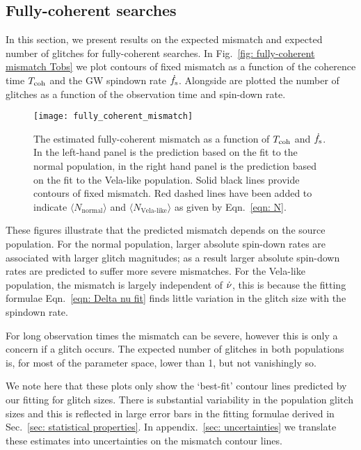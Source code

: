\documentclass[../full_thesis/full_thesis.tex]{subfiles}
\begin{document}
\subsection{Fully-coherent searches}

In this section, we present results on the expected mismatch and expected number
of glitches for fully-coherent searches. In Fig.~\ref{fig: fully-coherent mismatch
Tobs} we plot contours of fixed mismatch as a function of the coherence time
$T_{\mathrm{coh}}$ and the GW spindown rate $\dot{f}_{\textrm{s}}$. Alongside are plotted the number of
glitches as a function of the observation time and spin-down rate.
\begin{figure}[htb] \centering
\texttt{[image: fully\_coherent\_mismatch]}
\caption{The estimated fully-coherent
mismatch as a function of $T_{\mathrm{coh}}$ and $\dot{f}_{\textrm{s}}$. In the left-hand panel is the prediction based on the fit
to the normal population, in the right hand panel is the prediction based on
the fit to the Vela-like population. Solid black lines provide contours of fixed
mismatch. Red dashed lines have been added to indicate $\langle
N_\textrm{normal} \rangle$ and $\langle N_\textrm{Vela-like} \rangle$ as given
by Eqn.~\eqref{eqn: N}.}
\label{fig: fully-coherent mismatch Tobs}
\end{figure}

These figures illustrate that the predicted mismatch depends on the source
population. For the normal population, larger absolute spin-down rates are
associated with larger glitch magnitudes; as a result larger absolute spin-down
rates are predicted to suffer more severe mismatches. For the Vela-like
population, the mismatch is largely independent of $\dot{\nu}$, this is because
the fitting formulae Eqn.~\eqref{eqn: Delta nu fit} finds little variation in
the glitch size with the spindown rate.

For long observation times the mismatch can be severe, however this is only a
concern if a glitch occurs. The expected number of glitches in both populations
is, for most of the parameter space, lower than 1, but not vanishingly so.

We note here that these plots only show the `best-fit' contour lines predicted
by our fitting for glitch sizes. There is substantial variability in the population
glitch sizes and this is reflected in large error bars in the fitting formulae
derived in Sec.~\ref{sec: statistical properties}. In appendix.~\ref{sec: uncertainties}
we translate these estimates into uncertainties on the mismatch contour lines.
\end{document}
